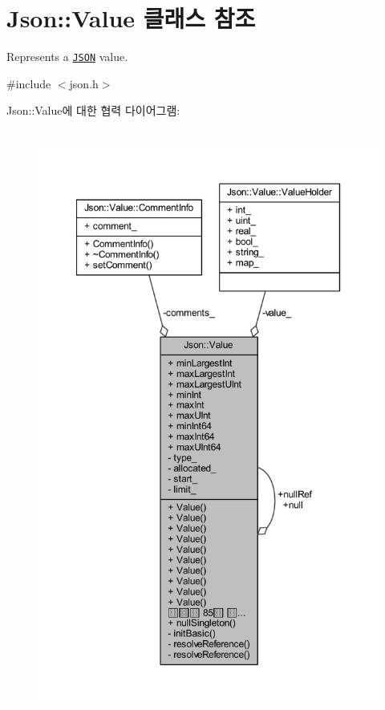 \hypertarget{class_json_1_1_value}{}\section{Json\+:\+:Value 클래스 참조}
\label{class_json_1_1_value}


Represents a \href{http://www.json.org}{\tt J\+S\+ON} value.  




{\ttfamily \#include $<$json.\+h$>$}



Json\+:\+:Value에 대한 협력 다이어그램\+:
\nopagebreak
\begin{figure}[H]
\begin{center}
\leavevmode
\includegraphics[height=550pt]{class_json_1_1_value__coll__graph}
\end{center}
\end{figure}

